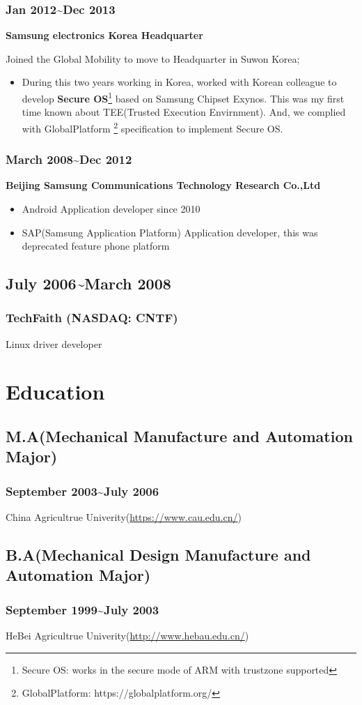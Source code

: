 \documentclass{article}
\begin{document}
\subsubsection{Jan 2012\~{}Dec 2013}
\textbf{Samsung electronics Korea Headquarter}

Joined the Global Mobility to move to Headquarter in Suwon Korea;

\begin{itemize}
    \item{}During this two years working in Korea, worked with Korean colleague to develop \textbf{Secure OS}\footnote{Secure OS: works in the secure mode of ARM with trustzone supported} based on Samsung Chipset Exynos.
This was my first time known about TEE(Trusted Execution Envirnment).
And, we complied with GlobalPlatform {\footnote {GlobalPlatform: https://globalplatform.org/}} specification to implement Secure OS.

\end{itemize}

\subsubsection{March 2008\~{}Dec 2012}
\textbf{Beijing Samsung Communications Technology Research Co.,Ltd}

\begin{itemize}
\item{Android Application developer} since 2010
\item{SAP(Samsung Application Platform) Application developer}, this was deprecated feature phone platform
\end{itemize}

\subsection{July 2006\~{}March 2008}
\subsubsection{TechFaith (NASDAQ: CNTF)}
Linux driver developer

\section{Education}

\subsection{M.A(Mechanical Manufacture and Automation Major)}
\subsubsection{September 2003\~{}July 2006}
China Agricultrue Univerity(\url{https://www.cau.edu.cn/})

\subsection{B.A(Mechanical Design Manufacture and Automation Major)}
\subsubsection{September 1999\~{}July 2003}
HeBei Agricultrue Univerity(\url{http://www.hebau.edu.cn/})
\end{document}
